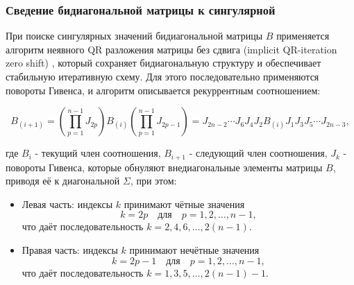 \subsubsection{Сведение бидиагональной матрицы к сингулярной}
При поиске сингулярных значений бидиагональной матрицы $B$ применяется алгоритм неявного QR разложения матрицы без сдвига (implicit QR-iteration zero shift) \cite{Demmel1990}, который сохраняет бидиагональную структуру и обеспечивает стабильную итеративную схему.
Для этого последовательно применяются повороты Гивенса, и алгоритм описывается рекуррентным соотношением:

\begin{equation}
B_{(i+1)} = \left( \prod_{p=1}^{n-1} J_{2p} \right) B_{(i)} \left( \prod_{p=1}^{n-1} J_{2p-1} \right) = J_{2n-2} \cdots J_6 J_4 J_2 B_{(i)} J_1 J_3 J_5 \cdots J_{2n-3}, \label{to_bidiag_reccur}
\end{equation}

где $B_i$ - текущий член соотношения, $B_{i+1}$ - следующий член соотношения, \( J_k \) - повороты Гивенса, которые обнуляют внедиагональные элементы матрицы \( B \), приводя её к диагональной \( \Sigma \), при этом:
 \begin{itemize}
     \item Левая часть: индексы $k$ принимают чётные значения
     \begin{equation}
     k = 2p \quad \text{для} \quad p = 1,2,\ldots,n-1,
     \end{equation}
     что даёт последовательность $k = 2,4,6,\ldots,2(n-1)$.
 
     \item Правая часть: индексы $k$ принимают нечётные значения
     \begin{equation}
     k = 2p-1 \quad \text{для} \quad p = 1,2,\ldots,n-1,
     \end{equation}
     что даёт последовательность $k = 1,3,5,\ldots,2(n-1)-1$.
 \end{itemize}

